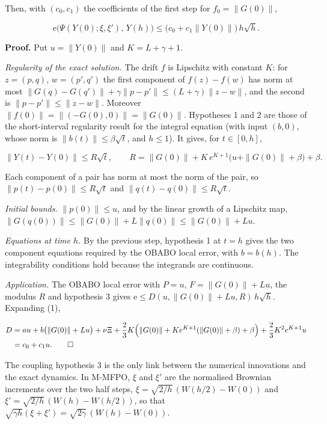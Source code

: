 \documentclass[11pt,a4paper]{report}
\begin{document}
Then, with \((c_0,c_1)\) the coefficients of the first step for \(f_0=\|G(0)\|\),


\[\mathrm e\bigl(\Psi(Y(0);\xi,\xi'),\,Y(h)\bigr)\le\bigl(c_0+c_1\|Y(0)\|\bigr)\,h\sqrt h .\]


\textbf{Proof.} Put \(u=\|Y(0)\|\) and \(K=L+\gamma+1\).




\emph{Regularity of the exact solution.} The drift \(f\) is Lipschitz with constant \(K\): for \(z=(p,q)\), \(w=(p',q')\) the first component of \(f(z)-f(w)\) has norm at most \(\|G(q)-G(q')\|+\gamma\|p-p'\|\le(L+\gamma)\|z-w\|\), and the second is \(\|p-p'\|\le\|z-w\|\). Moreover \(\|f(0)\|=\|(-G(0),0)\|=\|G(0)\|\). Hypotheses 1 and 2 are those of the short-interval regularity result for the integral equation (with input \((b,0)\), whose norm is \(\|b(t)\|\le\beta\sqrt t\), and \(h\le1\)). It gives, for \(t\in[0,h]\),


\[\|Y(t)-Y(0)\|\le R\sqrt t,\qquad R=\|G(0)\|+K\,e^{K+1}\bigl(u+\|G(0)\|+\beta\bigr)+\beta .\]


Each component of a pair has norm at most the norm of the pair, so \(\|p(t)-p(0)\|\le R\sqrt t\) and \(\|q(t)-q(0)\|\le R\sqrt t\).




\emph{Initial bounds.} \(\|p(0)\|\le u\), and by the linear growth of a Lipschitz map, \(\|G(q(0))\|\le\|G(0)\|+L\|q(0)\|\le\|G(0)\|+Lu\).




\emph{Equations at time \(h\).} By the previous step, hypothesis 1 at \(t=h\) gives the two component equations required by the OBABO local error, with \(b=b(h)\). The integrability conditions hold because the integrands are continuous.




\emph{Application.} The OBABO local error with \(P=u\), \(F=\|G(0)\|+Lu\), the modulus \(R\) and hypothesis 3 gives \(\mathrm e\le D(u,\|G(0)\|+Lu,R)\,h\sqrt h\). Expanding (1),


\[\begin{aligned}D&=au+b\bigl(\|G(0)\|+Lu\bigr)+\nu\Xi+\frac23K\Bigl(\|G(0)\|+Ke^{K+1}(\|G(0)\|+\beta)+\beta\Bigr)+\frac23K^2e^{K+1}u\\ &=c_0+c_1u. \qquad\square\end{aligned}\]


The coupling hypothesis 3 is the only link between the numerical innovations and the exact dynamics. In M-MFPO, \(\xi\) and \(\xi'\) are the normalised Brownian increments over the two half steps, \(\xi=\sqrt{2/h}\,(W(h/2)-W(0))\) and \(\xi'=\sqrt{2/h}\,(W(h)-W(h/2))\), so that \(\sqrt{\gamma h}(\xi+\xi')=\sqrt{2\gamma}\,(W(h)-W(0))\).
\end{document}
